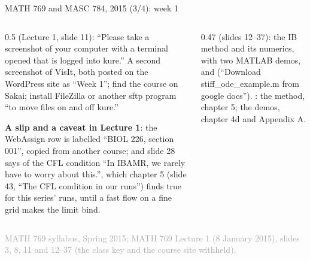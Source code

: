 \documentclass[aspectratio=169,11pt]{beamer}
\newcommand{\sourcecredit}[1]{\vfill\begin{flushright}\tiny\textcolor{DarkGray}{#1}\end{flushright}}
\begin{document}
\begin{frame}{MATH 769 and MASC 784, 2015 (3/4): week 1}
\label{fr:m769c3}
\begin{columns}[T,onlytextwidth]
\begin{column}{0.5\textwidth}
\footnotesize
{} (Lecture 1, slide 11): ``Please take a screenshot of your computer with a terminal opened that is logged into kure.'' A second screenshot of VisIt, both posted on the WordPress site as ``Week 1''; find the course on Sakai; install FileZilla or another sftp program ``to move files on and off kure.''

\vspace{2mm}
\begin{punchbox}
\scriptsize \textbf{A slip and a caveat in Lecture 1}: the WebAssign row is labelled ``BIOL 226, section 001'', copied from another course; and slide 28 says of the CFL condition ``In IBAMR, we rarely have to worry about this.'', which chapter 5 (slide 43, ``The CFL condition in our runs'') finds true for this series' runs, until a fast flow on a fine grid makes the limit bind.
\end{punchbox}
\end{column}
\begin{column}{0.47\textwidth}
\footnotesize
{} (slides 12--37): the IB method and its numerics, with two MATLAB demos,  and  (``Download stiff\_ode\_example.m from google docs''). : the method, chapter 5; the demos, chapter 4d and Appendix A.
\end{column}
\end{columns}
\sourcecredit{MATH 769 syllabus, Spring 2015; MATH 769 Lecture 1 (8 January 2015), slides 3, 8, 11 and 12--37 (the class key and the course site withheld).}
\end{frame}
\end{document}
